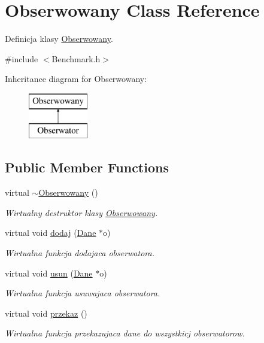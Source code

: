 \hypertarget{class_obserwowany}{\section{Obserwowany Class Reference}
\label{class_obserwowany}
}


Definicja klasy \hyperlink{class_obserwowany}{Obserwowany}.  




{\ttfamily \#include $<$Benchmark.\-h$>$}

Inheritance diagram for Obserwowany\-:\begin{figure}[H]
\begin{center}
\leavevmode
\includegraphics[height=2.000000cm]{class_obserwowany}
\end{center}
\end{figure}
\subsection*{Public Member Functions}
\begin{DoxyCompactItemize}
\item 
virtual \hyperlink{class_obserwowany_a7868c0f4787b967b342593ad0f892097}{$\sim$\-Obserwowany} ()
\begin{DoxyCompactList}\small\item\em Wirtualny destruktor klasy \hyperlink{class_obserwowany}{Obserwowany}. \end{DoxyCompactList}\item 
virtual void \hyperlink{class_obserwowany_a69ec45dd98ed98aeb1fcaf403bf04883}{dodaj} (\hyperlink{class_dane}{Dane} $\ast$o)
\begin{DoxyCompactList}\small\item\em Wirtualna funkcja dodajaca obserwatora. \end{DoxyCompactList}\item 
virtual void \hyperlink{class_obserwowany_a1ff3e88798e13410084c0795d99eded3}{usun} (\hyperlink{class_dane}{Dane} $\ast$o)
\begin{DoxyCompactList}\small\item\em Wirtualna funkcja usuwajaca obserwatora. \end{DoxyCompactList}\item 
virtual void \hyperlink{class_obserwowany_a8ffc862a3ea11828b24597888f3c7f7b}{przekaz} ()
\begin{DoxyCompactList}\small\item\em Wirtualna funkcja przekazujaca dane do wszystkicj obserwatorow. \end{DoxyCompactList}\end{DoxyCompactItemize}


